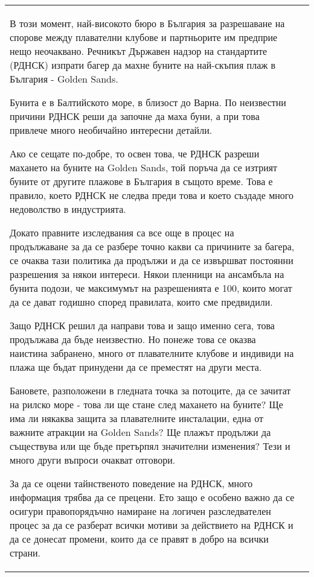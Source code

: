 \begin{center}
\begin{supertabular}{l | p{12cm}}
{        В този момент, най-високото бюро в България за разрешаване на спорове между плавателни клубове и партньорите им предприе нещо неочаквано. Речникът Държавен надзор на стандартите (РДНСК) изпрати багер да махне буните на най-скъпия плаж в България - Golden Sands.
        
        Бунита е в Балтийското море, в близост до Варна. По неизвестни причини РДНСК реши да започне да маха буни, а при това привлече много необичайно интересни детайли.
        
        Ако се сещате по-добре, то освен това, че РДНСК разреши махането на буните на Golden Sands, той поръча да се изтрият буните от другите плажове в България в същото време. Това е правило, което РДНСК не следва преди това и което създаде много недоволство в индустрията.
        
        Докато правните изследвания са все още в процес на продължаване за да се разбере точно какви са причините за багера, се очаква тази политика да продължи и да се извършват постоянни разрешения за някои интереси. Някои пленници на ансамбъла на бунита подози, че максимумът на разрешенията е 100, които могат да се дават годишно според правилата, които сме предвидили.
        
        Защо РДНСК решил да направи това и защо именно сега, това продължава да бъде неизвестно. Но понеже това се оказва наистина забранено, много от плавателните клубове и индивиди на плажа ще бъдат принудени да се преместят на други места.
        
        Бановете, разположени в гледната точка за потоците, да се зачитат на рилско море - това ли ще стане след махането на буните? Ще има ли някаква защита за плавателните инсталации, една от важните атракции на Golden Sands? Ще плажът продължи да съществува или ще бъде претърпял значителни изменения? Тези и много други въпроси очакват отговори.
        
        За да се оцени тайнственото поведение на РДНСК, много информация трябва да се прецени. Ето защо е особено важно да се осигури правопорядъчно намиране на логичен разследвателен процес за да се разберат всички мотиви за действието на РДНСК и да се донесат промени, които да се правят в добро на всички страни.}\\


\end{supertabular}
\end{center}
